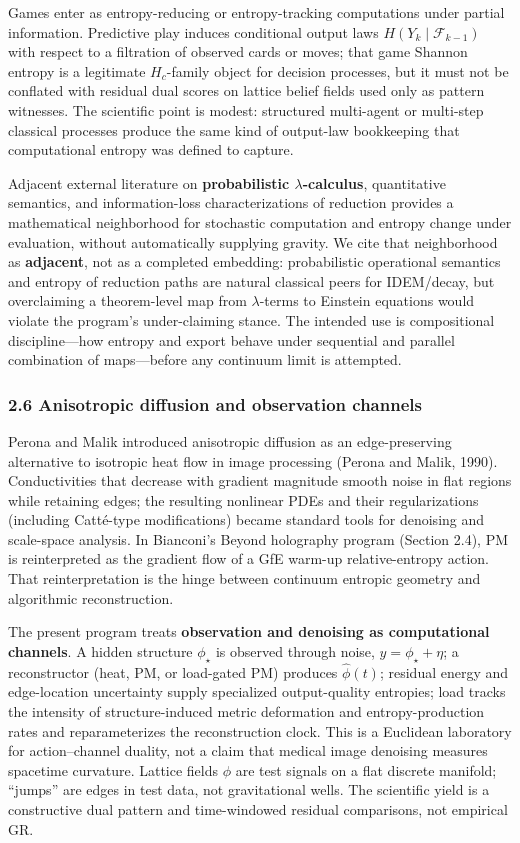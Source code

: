 \documentclass[
  11pt,
]{article}
\begin{document}
Games enter as entropy-reducing or entropy-tracking computations under partial information. Predictive play induces conditional output laws \(H(Y_k\mid\mathcal{F}_{k-1})\) with respect to a filtration of observed cards or moves; that game Shannon entropy is a legitimate \(H_c\)-family object for decision processes, but it must not be conflated with residual dual scores on lattice belief fields used only as pattern witnesses. The scientific point is modest: structured multi-agent or multi-step classical processes produce the same kind of output-law bookkeeping that computational entropy was defined to capture.

Adjacent external literature on \textbf{probabilistic \(\lambda\)-calculus}, quantitative semantics, and information-loss characterizations of reduction provides a mathematical neighborhood for stochastic computation and entropy change under evaluation, without automatically supplying gravity. We cite that neighborhood as \textbf{adjacent}, not as a completed embedding: probabilistic operational semantics and entropy of reduction paths are natural classical peers for IDEM/decay, but overclaiming a theorem-level map from \(\lambda\)-terms to Einstein equations would violate the program's under-claiming stance. The intended use is compositional discipline---how entropy and export behave under sequential and parallel combination of maps---before any continuum limit is attempted.

\subsubsection{2.6 Anisotropic diffusion and observation channels}\label{anisotropic-diffusion-and-observation-channels}

Perona and Malik introduced anisotropic diffusion as an edge-preserving alternative to isotropic heat flow in image processing (Perona and Malik, 1990). Conductivities that decrease with gradient magnitude smooth noise in flat regions while retaining edges; the resulting nonlinear PDEs and their regularizations (including Catt\'e-type modifications) became standard tools for denoising and scale-space analysis. In Bianconi's Beyond holography program (Section 2.4), PM is reinterpreted as the gradient flow of a GfE warm-up relative-entropy action. That reinterpretation is the hinge between continuum entropic geometry and algorithmic reconstruction.

The present program treats \textbf{observation and denoising as computational channels}. A hidden structure \(\phi_\star\) is observed through noise, \(y=\phi_\star+\eta\); a reconstructor (heat, PM, or load-gated PM) produces \(\hat\phi(t)\); residual energy and edge-location uncertainty supply specialized output-quality entropies; load tracks the intensity of structure-induced metric deformation and entropy-production rates and reparameterizes the reconstruction clock. This is a Euclidean laboratory for action--channel duality, not a claim that medical image denoising measures spacetime curvature. Lattice fields \(\phi\) are test signals on a flat discrete manifold; ``jumps'' are edges in test data, not gravitational wells. The scientific yield is a constructive dual pattern and time-windowed residual comparisons, not empirical GR.
\end{document}
